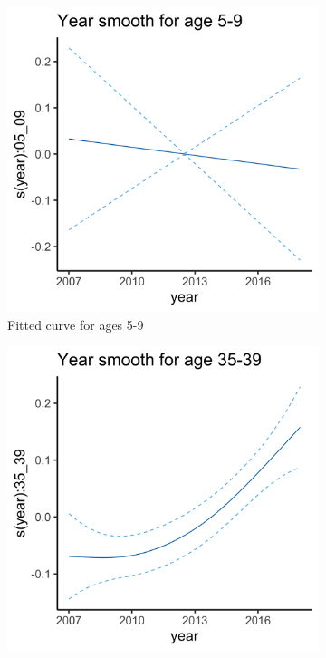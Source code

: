 \documentclass[11pt]{article}
\begin{document}
\begin{figure}
\centering
\begin{subfigure}[t]{0.32\textwidth}
\centering
\includegraphics[scale=0.077]{figs/gam_plot4.png}
\caption{Fitted curve  for ages 5-9}
\label{fig:gam_plot4}
\end{subfigure}
\begin{subfigure}[t]{0.32\textwidth}
\centering
\includegraphics[scale=0.077]{figs/gam_plot5.png}

\end{subfigure}
\end{figure}
\end{document}
